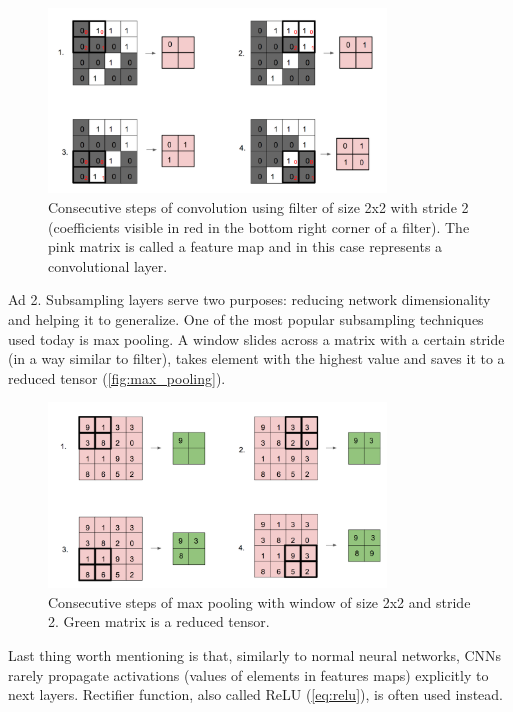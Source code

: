 \documentclass[11pt, a4paper]{article}
\begin{document}
\begin{figure}[h]
\includegraphics[width=0.8\textwidth]{convolution}
\centering
\caption[Kolejne kroki konwolucji przy użyciu filtra 2x2]{Consecutive steps of convolution using filter of size 2x2 with stride 2 (coefficients visible in red in the bottom right corner of a filter). The pink matrix is called a feature map and in this case represents a convolutional layer.}
\label{fig:convolution}
\end{figure}

Ad 2. Subsampling layers serve two purposes: reducing network dimensionality and helping it to generalize. One of the most popular subsampling techniques used today is max pooling. A window slides across a matrix with a certain stride (in a way similar to filter), takes element with the highest value and saves it to a reduced tensor (\autoref{fig:max_pooling}).\\

\begin{figure}[H]
\includegraphics[width=0.8\textwidth]{max_pooling}
\centering
\caption[Kolejne kroki techniki max pooling przy użyciu okna 2x2]{Consecutive steps of max pooling with window of size 2x2 and stride 2. Green matrix is a reduced tensor.}
\label{fig:max_pooling}
\end{figure}

Last thing worth mentioning is that, similarly to normal neural networks, CNNs rarely propagate activations (values of elements in features maps) explicitly to next layers. Rectifier function, also called ReLU (\autoref{eq:relu}), is often used instead.
\end{document}
